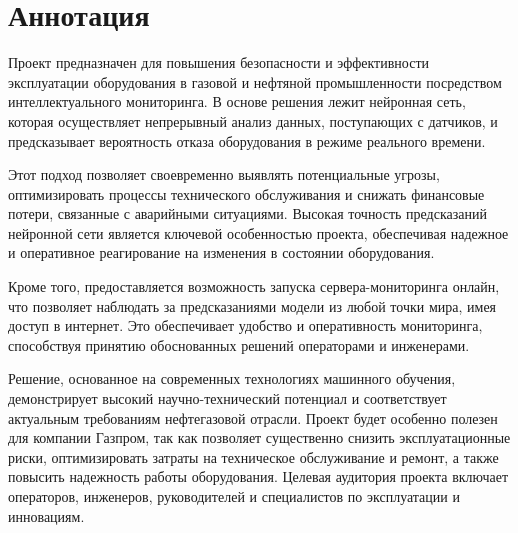\documentclass[a4paper,12pt]{article}
\begin{document}
\newpage
\tableofcontents
\newpage

\newpage
\section{\centering Аннотация}

\begin{flushleft}
Проект предназначен для повышения безопасности и эффективности эксплуатации оборудования в газовой и нефтяной промышленности
посредством интеллектуального мониторинга. В основе решения лежит нейронная сеть, которая осуществляет непрерывный анализ данных,
поступающих с датчиков, и предсказывает вероятность отказа оборудования в режиме реального времени.

Этот подход позволяет своевременно выявлять потенциальные угрозы, оптимизировать процессы технического
обслуживания и снижать финансовые потери, связанные с аварийными ситуациями.
Высокая точность предсказаний нейронной сети является ключевой особенностью проекта,
обеспечивая надежное и оперативное реагирование на изменения в состоянии оборудования.

Кроме того, предоставляется возможность запуска сервера-мониторинга онлайн, что позволяет наблюдать за
предсказаниями модели из любой точки мира, имея доступ в интернет.
Это обеспечивает удобство и оперативность мониторинга, способствуя принятию обоснованных решений операторами и инженерами.

Решение, основанное на современных технологиях машинного обучения, демонстрирует высокий научно-технический потенциал
и соответствует актуальным требованиям нефтегазовой отрасли.
Проект будет особенно полезен для компании Газпром, так как позволяет существенно снизить эксплуатационные риски,
оптимизировать затраты на техническое обслуживание и ремонт, а также повысить надежность работы оборудования.
Целевая аудитория проекта включает операторов, инженеров, руководителей и специалистов по эксплуатации и инновациям.
\end{flushleft}


\newpage
\end{document}
